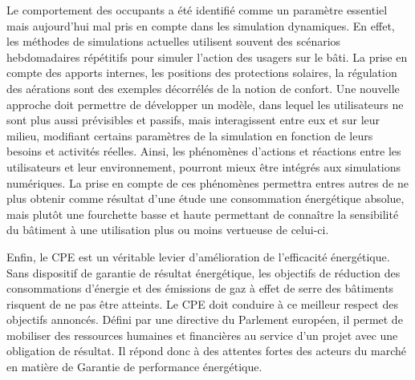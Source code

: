 Le comportement des occupants a été identifié comme un paramètre essentiel mais aujourd'hui mal pris en compte dans les simulation dynamiques. En effet, les méthodes de simulations actuelles utilisent souvent des scénarios hebdomadaires répétitifs pour simuler l'action des usagers sur le bâti. La prise en compte des apports internes, les positions des protections solaires, la régulation des aérations sont des exemples décorrélés de la notion de confort. Une nouvelle approche doit permettre de développer un modèle, dans lequel les utilisateurs ne sont plus aussi prévisibles et passifs, mais interagissent entre eux et sur leur milieu, modifiant certains paramètres de la simulation en fonction de leurs besoins et activités réelles. Ainsi, les phénomènes d'actions et réactions entre les utilisateurs et leur environnement, pourront mieux être intégrés aux simulations numériques. La prise en compte de ces phénomènes permettra entres autres de ne plus obtenir comme résultat d'une étude une consommation énergétique absolue, mais plutôt une fourchette basse et haute permettant de connaître la sensibilité du bâtiment à une utilisation plus ou moins vertueuse de celui-ci.

Enfin, le CPE est un véritable levier d'amélioration de l'efficacité énergétique. Sans dispositif de garantie de résultat énergétique, les objectifs de réduction des consommations d'énergie et des émissions de gaz à effet de serre des bâtiments risquent de ne pas être atteints. Le CPE doit conduire à ce meilleur respect des objectifs annoncés. Défini par une directive du Parlement européen, il permet de mobiliser des ressources humaines et financières au service d'un projet avec une obligation de résultat. Il répond donc à des attentes fortes des acteurs du marché en matière de Garantie de performance énergétique.